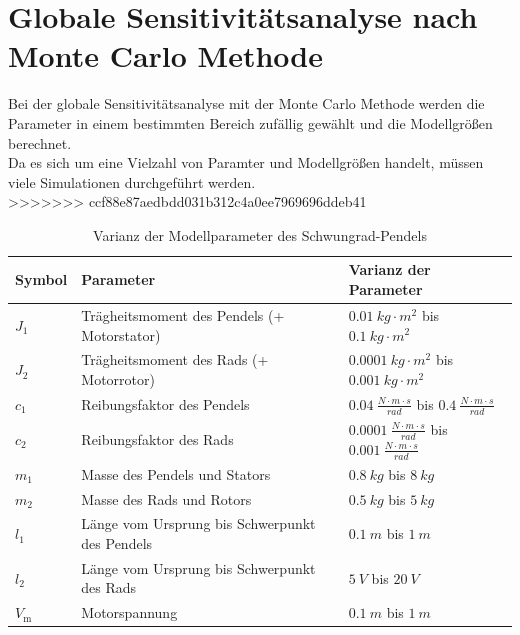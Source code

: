 \section{Globale Sensitivitätsanalyse nach Monte Carlo Methode}
Bei der globale Sensitivitätsanalyse mit der Monte Carlo Methode werden die Parameter in einem bestimmten Bereich zufällig gewählt und die Modellgrößen berechnet.\\
Da es sich um eine Vielzahl von Paramter und Modellgrößen handelt, müssen viele Simulationen durchgeführt werden.\\
>>>>>>> ccf88e87aedbdd031b312c4a0ee7969696ddeb41
\begin{table}[H]
    \centering
    \begin{tabular}{|lll|}
        \hline
        \rowcolor{grey}
        \textbf{Symbol}     & \textbf{Parameter}                                & \textbf{Varianz der Parameter}                         \\ \hline
        $J_{\mathrm{1}}$    & Trägheitsmoment des Pendels (+ Motorstator)       & $\SI{0.01}{kg \cdot m^2}$ bis $\SI{0.1}{kg \cdot m^2}$                  \\
        $J_{\mathrm{2}}$    & Trägheitsmoment des Rads (+ Motorrotor)           & $\SI{0.0001}{kg \cdot m^2} $ bis $\SI{0.001}{kg \cdot m^2}$               \\
        $c_{\mathrm{1}}$    & Reibungsfaktor des Pendels                        & $\SI{0.04}{\frac{N \cdot m \cdot s}{rad}}$ bis $\SI{0.4}{\frac{N \cdot m \cdot s}{rad}}$    \\
        $c_{\mathrm{2}}$    & Reibungsfaktor des Rads                           & $\SI{0.0001}{\frac{N \cdot m \cdot s}{rad}}$ bis $\SI{0.001}{\frac{N \cdot m \cdot s}{rad}}$  \\
        $m_{\mathrm{1}}$    & Masse des Pendels und Stators                     & $\SI{0.8}{kg}$ bis $\SI{8}{kg}$                              \\
        $m_{\mathrm{2}}$    & Masse des Rads und Rotors                         & $\SI{0.5}{kg}$ bis $\SI{5}{kg}$                              \\
        $l_{\mathrm{1}}$    & Länge vom Ursprung bis Schwerpunkt des Pendels    & $\SI{0.1}{m}$ bis $\SI{1}{m}$                              \\
        $l_{\mathrm{2}}$    & Länge vom Ursprung bis Schwerpunkt des Rads       & $\SI{5}{V}$ bis $\SI{20}{V}$  \\
        $V_{\mathrm{m}}$    & Motorspannung       & $\SI{0.1}{m}$ bis $\SI{1}{m}$                                \\ \hline
    \end{tabular}
    \caption{Varianz der Modellparameter des Schwungrad-Pendels}
    \label{tab:varianz_parameter}
\end{table}


